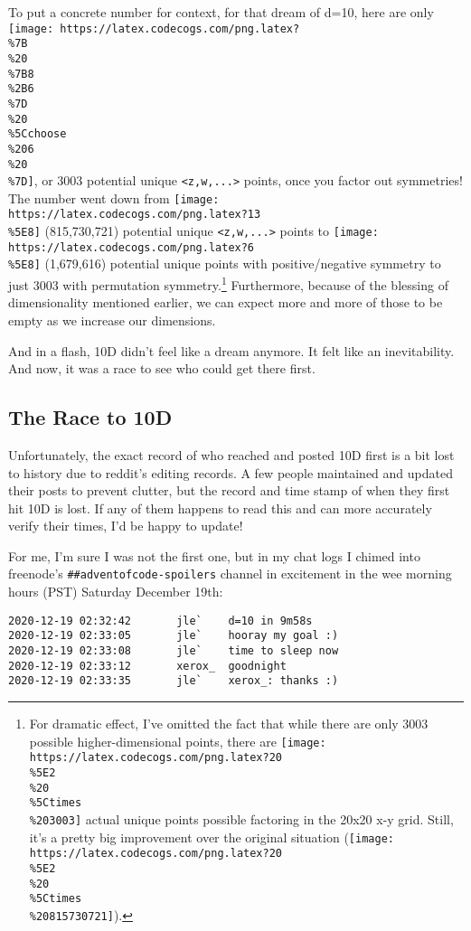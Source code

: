 \documentclass[]{article}
\begin{document}
To put a concrete number for context, for that dream of d=10, here are only
\texttt{[image: https://latex.codecogs.com/png.latex?\\\%7B\\\%20\\\%7B8\\\%2B6\\\%7D\\\%20\\\%5Cchoose\\\%206\\\%20\\\%7D]},
or 3003 potential unique \texttt{\textless{}z,w,...\textgreater{}} points, once
you factor out symmetries! The number went down from
\texttt{[image: https://latex.codecogs.com/png.latex?13\\\%5E8]} (815,730,721)
potential unique \texttt{\textless{}z,w,...\textgreater{}} points to
\texttt{[image: https://latex.codecogs.com/png.latex?6\\\%5E8]} (1,679,616)
potential unique points with positive/negative symmetry to just 3003 with
permutation symmetry.\footnote{For dramatic effect, I've omitted the fact that
  while there are only 3003 possible higher-dimensional points, there are
  \texttt{[image: https://latex.codecogs.com/png.latex?20\\\%5E2\\\%20\\\%5Ctimes\\\%203003]}
  actual unique points possible factoring in the 20x20 x-y grid. Still, it's a
  pretty big improvement over the original situation
  (\texttt{[image: https://latex.codecogs.com/png.latex?20\\\%5E2\\\%20\\\%5Ctimes\\\%20815730721]}).}
Furthermore, because of the blessing of dimensionality mentioned earlier, we can
expect more and more of those to be empty as we increase our dimensions.

And in a flash, 10D didn't feel like a dream anymore. It felt like an
inevitability. And now, it was a race to see who could get there first.

\hypertarget{the-race-to-10d}{%
\subsection{The Race to 10D}\label{the-race-to-10d}}

Unfortunately, the exact record of who reached and posted 10D first is a bit
lost to history due to reddit's editing records. A few people maintained and
updated their posts to prevent clutter, but the record and time stamp of when
they first hit 10D is lost. If any of them happens to read this and can more
accurately verify their times, I'd be happy to update!

For me, I'm sure I was not the first one, but in my chat logs I chimed into
freenode's \texttt{\#\#adventofcode-spoilers} channel in excitement in the wee
morning hours (PST) Saturday December 19th:

\begin{verbatim}
2020-12-19 02:32:42       jle`    d=10 in 9m58s
2020-12-19 02:33:05       jle`    hooray my goal :)
2020-12-19 02:33:08       jle`    time to sleep now
2020-12-19 02:33:12       xerox_  goodnight
2020-12-19 02:33:35       jle`    xerox_: thanks :)
\end{verbatim}
\end{document}
